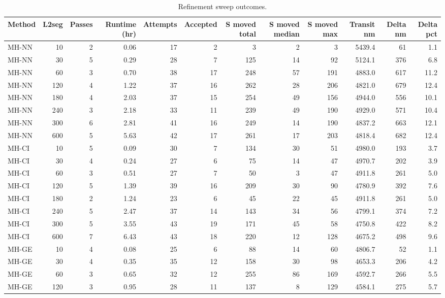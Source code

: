 \begin{table}[b]
\centering
\caption{Refinement sweep outcomes.}
\label{tab:refinement-sweep}
\begin{tabular}{lrrr|rr|rrr|rrr}
\toprule
Method & L2seg & Passes & Runtime (hr) & Attempts & Accepted & S moved total & S moved median & S moved max & Transit nm & Delta nm & Delta pct
\\
\midrule
MH-NN & 10 & 2 & 0.06 & 17 & 2 & 3 & 2 & 3 & 5439.4 & 61 & 1.1\\%
MH-NN & 30 & 5 & 0.29 & 28 & 7 & 125 & 14 & 92 & 5124.1 & 376 & 6.8\\%
MH-NN & 60 & 3 & 0.70 & 38 & 17 & 248 & 57 & 191 & 4883.0 & 617 & 11.2\\%
MH-NN & 120 & 4 & 1.22 & 37 & 16 & 262 & 28 & 206 & 4821.0 & 679 & 12.4\\%
MH-NN & 180 & 4 & 2.03 & 37 & 15 & 254 & 49 & 156 & 4944.0 & 556 & 10.1\\%
MH-NN & 240 & 3 & 2.18 & 33 & 11 & 239 & 49 & 190 & 4929.0 & 571 & 10.4\\%
MH-NN & 300 & 6 & 2.81 & 41 & 16 & 249 & 14 & 190 & 4837.2 & 663 & 12.1\\%
MH-NN & 600 & 5 & 5.63 & 42 & 17 & 261 & 17 & 203 & 4818.4 & 682 & 12.4\\%
MH-CI & 10 & 5 & 0.09 & 30 & 7 & 134 & 30 & 51 & 4980.0 & 193 & 3.7\\%
MH-CI & 30 & 4 & 0.24 & 27 & 6 & 75 & 14 & 47 & 4970.7 & 202 & 3.9\\%
MH-CI & 60 & 3 & 0.51 & 27 & 7 & 50 & 3 & 47 & 4911.8 & 261 & 5.0\\%
MH-CI & 120 & 5 & 1.39 & 39 & 16 & 209 & 30 & 90 & 4780.9 & 392 & 7.6\\%
MH-CI & 180 & 2 & 1.24 & 23 & 6 & 45 & 22 & 45 & 4911.8 & 261 & 5.0\\%
MH-CI & 240 & 5 & 2.47 & 37 & 14 & 143 & 34 & 56 & 4799.1 & 374 & 7.2\\%
MH-CI & 300 & 5 & 3.55 & 43 & 19 & 171 & 45 & 58 & 4750.8 & 422 & 8.2\\%
MH-CI & 600 & 7 & 6.43 & 43 & 18 & 220 & 12 & 128 & 4675.2 & 498 & 9.6\\%
MH-GE & 10 & 4 & 0.08 & 25 & 6 & 88 & 14 & 60 & 4806.7 & 52 & 1.1\\%
MH-GE & 30 & 4 & 0.35 & 35 & 12 & 158 & 30 & 98 & 4653.3 & 206 & 4.2\\%
MH-GE & 60 & 3 & 0.65 & 32 & 12 & 255 & 86 & 169 & 4592.7 & 266 & 5.5\\%
MH-GE & 120 & 3 & 0.95 & 28 & 11 & 137 & 8 & 129 & 4584.1 & 275 & 5.7\\%

\end{tabular}
\end{table}
